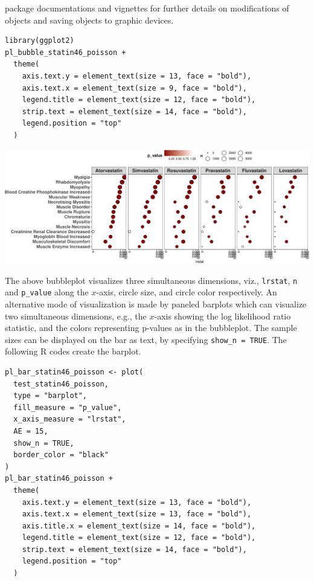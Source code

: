 package documentations and vignettes for further details on modifications of  objects and saving  objects to graphic devices.

\begin{verbatim}
library(ggplot2)
pl_bubble_statin46_poisson +
  theme(
    axis.text.y = element_text(size = 13, face = "bold"),
    axis.text.x = element_text(size = 9, face = "bold"),
    legend.title = element_text(size = 12, face = "bold"),
    strip.text = element_text(size = 14, face = "bold"),
    legend.position = "top"
  )
\end{verbatim}

\begin{center}\includegraphics[width=1\linewidth]{RJ-2023-027_files/figure-latex/show-heatmap-poisson-statin46-1} \end{center}

The above bubbleplot visualizes three simultaneous dimensions, viz., \texttt{lrstat}, \texttt{n} and \texttt{p\_value} along the \(x\)-axis, circle size, and circle color respectively. An alternative mode of visualization is made by paneled barplots which can visualize two simultaneous dimensions, e.g., the \(x\)-axis showing the log likelihood ratio statistic, and the colors representing p-values as in the bubbleplot. The sample sizes can be displayed on the bar as text, by specifying \texttt{show\_n\ =\ TRUE}. The following R codes create the barplot.

\begin{verbatim}
pl_bar_statin46_poisson <- plot(
  test_statin46_poisson,
  type = "barplot",
  fill_measure = "p_value",
  x_axis_measure = "lrstat",
  AE = 15,
  show_n = TRUE,
  border_color = "black"
) 
pl_bar_statin46_poisson +
  theme(
    axis.text.y = element_text(size = 13, face = "bold"),
    axis.text.x = element_text(size = 13, face = "bold"),
    axis.title.x = element_text(size = 14, face = "bold"),
    legend.title = element_text(size = 12, face = "bold"),
    strip.text = element_text(size = 14, face = "bold"),
    legend.position = "top"
  )
\end{verbatim}

